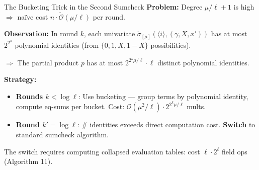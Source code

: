 \documentclass[aspectratio=169,10pt]{beamer}
\newcommand{\wt}[1]{\widetilde{#1}}
\newcommand{\bigO}{\mathcal{O}}
\begin{document}
\begin{frame}{The Bucketing Trick in the Second Sumcheck}
\textbf{Problem:} Degree $\mu/\ell + 1$ is high $\Rightarrow$ na\"ive cost $n \cdot \widetilde{\bigO}(\mu/\ell)$ per round.

\vspace{0.5em}
\textbf{Observation:} In round $k$, each univariate $\wt{\sigma}_{[\mu]}(\langle i \rangle, (\gamma, X, x'))$ has at most $2^{2^k}$ polynomial identities (from $\{0, 1, X, 1-X\}$ possibilities).

$\Rightarrow$ The partial product $p$ has at most $2^{2^k \mu/\ell} \cdot \ell$ distinct polynomial identities.

\vspace{0.5em}
\textbf{Strategy:}
\begin{itemize}
  \item \textbf{Rounds $k < \log\ell$}: Use bucketing --- group terms by polynomial identity, compute eq-sums per bucket. Cost: $\bigO(\mu^2/\ell) \cdot 2^{2^k \mu/\ell}$ mults.
  \item \textbf{Round $k' = \log\ell$}: \# identities exceeds direct computation cost. \textbf{Switch} to standard sumcheck algorithm.
\end{itemize}

\vspace{0.3em}
The switch requires computing collapsed evaluation tables: cost $\ell \cdot 2^\ell$ field ops (Algorithm 11).
\end{frame}
\end{document}
